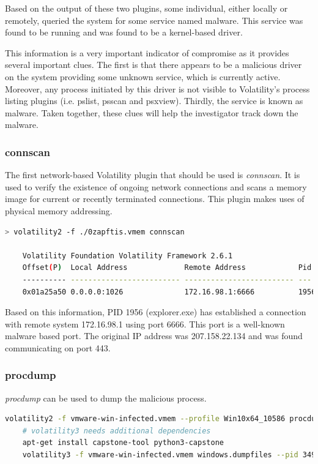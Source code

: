 Based on the output of these two plugins, some individual, either locally or remotely, queried the system for some service named malware. This service was found to be running and was found to be a kernel-based driver.

This information is a very important indicator of compromise as it provides several important clues. The first is that there appears to be a malicious driver on the system providing some unknown service, which is currently active. Moreover, any process initiated by this driver is not visible to Volatility’s process listing plugins (i.e. pslist, psscan and psxview). Thirdly, the service is known as malware. Taken together, these clues will help the investigator track down the malware.

\subsubsection{connscan}
The first network-based Volatility plugin that should be used is \textit{connscan}. It is used to verify the existence of ongoing network connections and scans a memory image for current or recently terminated connections. This plugin makes uses of physical memory addressing.

\begin{lstlisting}[language=bash]
    > volatility2 -f ./0zapftis.vmem connscan

    Volatility Foundation Volatility Framework 2.6.1
    Offset(P)  Local Address             Remote Address            Pid
    ---------- ------------------------- ------------------------- ---
    0x01a25a50 0.0.0.0:1026              172.16.98.1:6666          1956
\end{lstlisting}

Based on this information, PID 1956 (explorer.exe) has established a connection with remote system 172.16.98.1 using port 6666. This port is a well-known malware based port. The original IP address was 207.158.22.134 and was found communicating on port 443.

\columnbreak

\subsubsection{procdump}
\textit{procdump} can be used to dump the malicious process.

\begin{lstlisting}[language=bash]
    volatility2 -f vmware-win-infected.vmem --profile Win10x64_10586 procdump --pid 3496 --dump-dir .
    # volatility3 needs additional dependencies
    apt-get install capstone-tool python3-capstone
    volatility3 -f vmware-win-infected.vmem windows.dumpfiles --pid 3496
\end{lstlisting}

